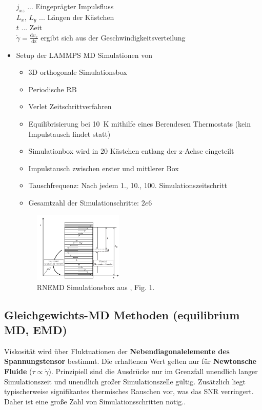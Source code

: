 \documentclass[a4paper, 10pt, 
               numbers=noenddot, toc=graduated,
               headsepline=true, footsepline=true,
               twoside=false, titlepage=true, 
               bibliography=totoc]{scrartcl}
\begin{document}
\begin{itemize}
  		   $j_{xz}$ ... Eingeprägter Impulsfluss\\
  		   $L_x,\,L_y$ ... Längen der Kästchen\\
  		   $t$ ... Zeit\\
  		   $\dot{\gamma} = \frac{\mathrm{d}v_x}{\mathrm{dz}}$ ergibt sich aus der Geschwindigkeitsverteilung
		  
		 \item Setup der LAMMPS MD Simulationen von \cite{Tenney2010} 
		 		\begin{itemize}
		 			\item 3D orthogonale Simulationsbox
		 			\item Periodische RB
		 			\item Verlet Zeitschrittverfahren
		 			\item Equilibrisierung bei \SI{10}{K} mithilfe eines Berendesen Thermostats (kein Impulstausch findet statt)
		 			\item Simulationbox wird in 20 Kästchen entlang der z-Achse eingeteilt
		 			\item Impulstausch zwischen erster und mittlerer Box
		 			\item Tauschfrequenz: Nach jedem 1., 10., 100. Simulationszeitschritt
		 			\item Gesamtzahl der Simulationschritte: $2e6$
		 		\end{itemize}
		 	
		 
		 
		\begin{figure}[H]
	    	\includegraphics[width=0.4\textwidth]{figs/rnemd_box}%
	    	\caption{RNEMD Simulationsbox aus \cite{Tenney2010}, Fig. 1.}
   		\end{figure}		 
		 
	\end{itemize}



\subsection{Gleichgewichts-MD Methoden (equilibrium MD, EMD)}
Viskosität wird über Fluktuationen der \textbf{Nebendiagonalelemente des Spannungstensor} bestimmt. Die erhaltenen Wert gelten nur für \textbf{Newtonsche Fluide} ($\tau \propto \dot{\gamma}$). Prinzipiell sind die Ausdrücke nur im Grenzfall unendlich langer Simulationszeit und unendlich großer Simulationszelle gültig. Zusätzlich liegt typischerweise signifikantes thermisches Rauschen vor, was das SNR verringert. Daher ist eine große Zahl von Simulationsschritten nötig.\cite{Tenney2010}.
\end{document}
